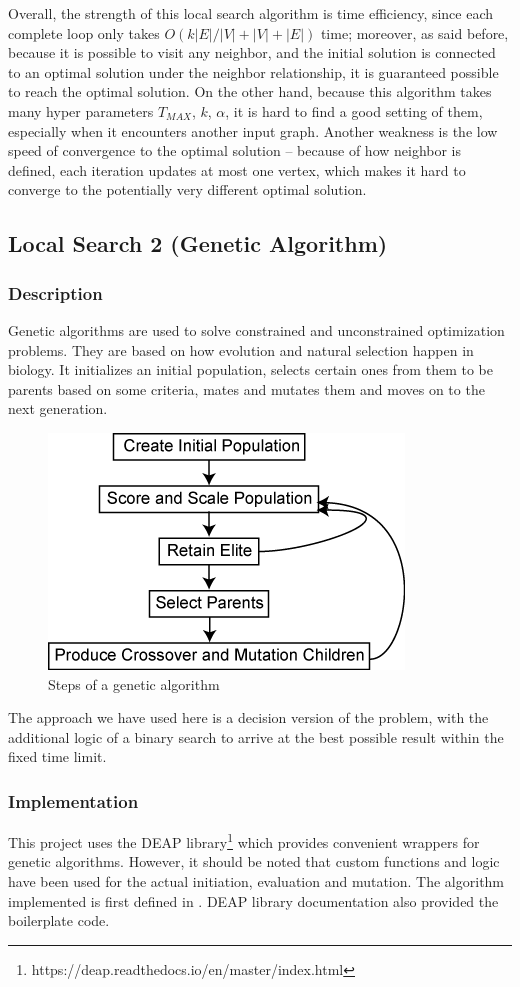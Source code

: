 \documentclass[acmlarge]{acmart}
\begin{document}
Overall, the strength of this local search algorithm is time efficiency, since each complete loop only takes $O(k|E|/|V| + |V| + |E|)$ time; moreover, as said before, because it is possible to visit any neighbor, and the initial solution is connected to an optimal solution under the neighbor relationship, it is guaranteed possible to reach the optimal solution. On the other hand, because this algorithm takes many hyper parameters $T_{MAX}$, $k$, $\alpha$, it is hard to find a good setting of them, especially when it encounters another input graph. Another weakness is the low speed of convergence to the optimal solution -- because of how neighbor is defined, each iteration updates at most one vertex, which makes it hard to converge to the potentially very different optimal solution.

\subsection{Local Search 2 (Genetic Algorithm)}

\subsubsection{Description}

Genetic algorithms are used to solve constrained and unconstrained optimization problems. They are based on how evolution and natural selection happen in biology. It initializes an initial population, selects certain ones from them to be parents based on some criteria, mates and mutates them and moves on to the next generation. 

\begin{figure}[h]
	\includegraphics[width=0.4\linewidth]{genetic_diagram.png}
	\caption{Steps of a genetic algorithm \cite{mathworks_2012}}
\end{figure}

The approach we have used here is a decision version of the problem, with the additional logic of a binary search to arrive at the best possible result within the fixed time limit.

\subsubsection{Implementation}
This project uses the DEAP library\footnote{https://deap.readthedocs.io/en/master/index.html} which provides convenient wrappers for genetic algorithms. However, it should be noted that custom functions and logic have been used for the actual initiation, evaluation and mutation. The algorithm implemented is first defined in \cite{back2018evolutionary}. DEAP library documentation also provided the boilerplate code.
\end{document}
